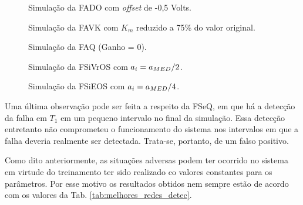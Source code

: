 \begin{figure}[htb]
\footnotesize
\centering

\vspace{1cm}
\caption{Simulação da FADO com {\it offset} de -0,5 Volts.}
\label{fig:fado}
\end{figure}

\begin{figure}[htb]
\footnotesize
\centering

\vspace{1cm}
\caption{Simulação da FAVK com $K_m$ reduzido a 75\% do valor original.}
\label{fig:favk}
\end{figure}

\begin{figure}[htb]
\footnotesize
\centering

\vspace{1cm}
\caption{Simulação da FAQ (Ganho = 0).}
\label{fig:faq}
\end{figure}

\begin{figure}[htb]
\footnotesize
\centering

\vspace{1cm}
\caption{Simulação da FSiVrOS com $a_i = a_{\tiny MED}/2$.}
\label{fig:fsivros}
\end{figure}

\begin{figure}[htb]
\footnotesize
\centering

\vspace{1cm}
\caption{Simulação da FSiEOS com $a_i = a_{\tiny MED}/4$.}
\label{fig:fsieos}
\end{figure}

Uma última observação pode ser feita a respeito da FSeQ, em que há a detecção da
falha em $T_1$ em um pequeno intervalo no final da simulação. Essa detecção
entretanto não comprometeu o funcionamento do sistema nos intervalos em que a
falha deveria realmente ser detectada. Trata-se, portanto, de um falso positivo.

Como dito anteriormente, as situações adversas podem ter ocorrido no sistema em
virtude do treinamento ter sido realizado co valores constantes para os
parâmetros. Por esse motivo os resultados obtidos nem sempre estão de acordo com
os valores da Tab. \ref{tab:melhores_redes_detec}.



